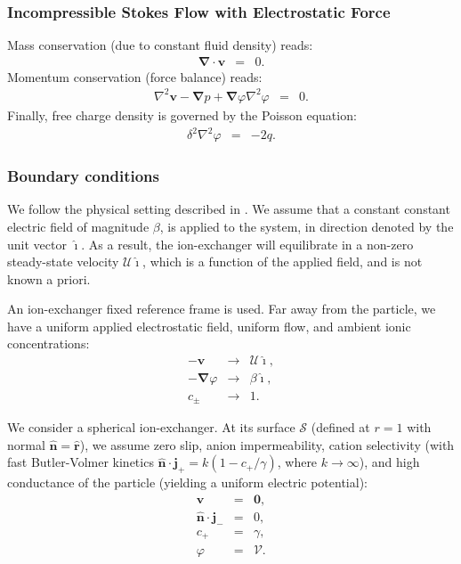 \documentclass[final]{elsarticle}
\newcommand\Laplacian{\nabla^2}
\newcommand\bnabla{\boldsymbol{\nabla}}
\newcommand\bv{\boldsymbol{v}}
\newcommand\bn{\boldsymbol{\hat{n}}}
\newcommand\bj{\boldsymbol{j}}
\newcommand\br{\boldsymbol{r}}
\newcommand\brhat{\hat{\br}}
\newcommand\bzero{\boldsymbol{0}}
\newcommand\cU{\mathscr{U}}
\newcommand\cV{\mathscr{V}}
\newcommand\ui{\boldsymbol{\hat{\imath}}}
\begin{document}
\subsubsection{Incompressible Stokes Flow with Electrostatic Force}
Mass conservation (due to constant fluid density) reads:
\begin{eqnarray*}
\bnabla \cdot \bv &=& 0.
\end{eqnarray*}
Momentum conservation (force balance) reads:
\begin{eqnarray*}
\Laplacian \bv - \bnabla p + \bnabla \varphi \Laplacian \varphi &=& 0.
\end{eqnarray*}
Finally, free charge density is governed by the Poisson equation:
\begin{eqnarray*}
\delta^2 \Laplacian \varphi &=& -2q.
\end{eqnarray*}

\subsubsection{Boundary conditions}
We follow the physical setting described in \cite{yariv2010migration}.
We assume that a constant constant electric field of magnitude $\beta$,
is applied to the system, in direction denoted by the unit vector $\ui$.
As a result, the ion-exchanger will equilibrate in 
a non-zero steady-state velocity $\cU \ui$, which is
a function of the applied field, and is not known a priori.

An ion-exchanger fixed reference frame is used.
Far away from the particle, we have a uniform applied electrostatic field, uniform flow,
and ambient ionic concentrations:
\begin{eqnarray*}
-\bv &\rightarrow& \cU \ui, \\
-\bnabla \varphi &\rightarrow& \beta\ui, \\
c_\pm &\rightarrow& 1.
\end{eqnarray*}

We consider a spherical ion-exchanger. 
At its surface $\mathcal{S}$ (defined at $r=1$ with normal $\bn = \brhat$), 
we assume zero slip, anion impermeability, cation selectivity 
(with fast Butler-Volmer\cite{bard2000book} kinetics
$\bn \cdot \bj_+ = k (1 - c_+/\gamma)$, where $k \rightarrow \infty$),
and high conductance of the particle (yielding a uniform electric potential):
\begin{eqnarray*}
\bv & = & \bzero, \\
\bn \cdot \bj_- & = & 0, \\
c_+ &=& \gamma, \\
\varphi & = & \cV.
\end{eqnarray*}
\end{document}
